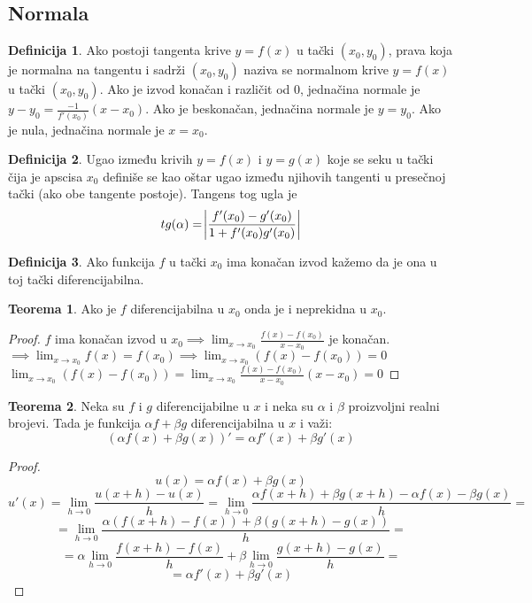 \documentclass{article}
\theoremstyle{definition}
\newtheorem{definition}{Definicija}[section]
\newtheorem{theorem}{Teorema}[section]
\begin{document}
        \subsection{Normala}
            \begin{definition}
                Ako postoji tangenta krive $y = f(x)$ u tački $(x_0, y_0)$, prava koja je normalna na tangentu i sadrži $(x_0, y_0)$ naziva se normalnom krive $y = f(x)$ u tački $(x_0, y_0)$.
                Ako je izvod konačan i različit od 0, jednačina normale je $y - y_0 = \frac{-1}{f'(x_0)}(x - x_0)$. Ako je beskonačan, jednačina normale je $y = y_0$. Ako je nula, jednačina normale je $x = x_0$.
            \end{definition}

        \begin{definition}
            Ugao između krivih $y = f(x)$ i $y = g(x)$ koje se seku u tački čija je apscisa $x_0$ definiše se kao oštar ugao između njihovih tangenti u presečnoj tački (ako obe tangente postoje). Tangens tog ugla je
            $$tg(\alpha) = \abs{\frac{f'(x_0) - g'(x_0)}{1 + f'(x_0)g'(x_0)}}$$
        \end{definition}

        \begin{definition}
            Ako funkcija $f$ u tački $x_0$ ima konačan izvod kažemo da je ona u toj tački diferencijabilna.
        \end{definition}

        \begin{theorem}
            Ako je $f$ diferencijabilna u $x_0$ onda je i neprekidna u $x_0$.
        \end{theorem}
        \begin{proof}
            $f$ ima konačan izvod u $x_0 \implies \lim_{x \to x_0} \frac{f(x) - f(x_0)}{x - x_0}$ je konačan.
            $\implies \lim_{x \to x_0} f(x) = f(x_0) \implies \lim_{x \to x_0} (f(x) - f(x_0)) = 0$
            $\lim_{x \to x_0} (f(x) - f(x_0)) = \lim_{x \to x_0} \frac{f(x) - f(x_0)}{x - x_0}(x - x_0) = 0$
        \end{proof}

        \begin{theorem}
            Neka su $f$ i $g$ diferencijabilne u $x$ i neka su $\alpha$ i $\beta$ proizvoljni realni brojevi. Tada je funkcija $\alpha f + \beta g$ diferencijabilna u $x$ i važi:
            $$(\alpha f(x) + \beta g(x))' = \alpha f'(x) + \beta g'(x)$$
        \end{theorem}
        \begin{proof}
            $$u(x) = \alpha f(x) + \beta g(x)$$
            $$u'(x) = \lim_{h \to 0} \frac{u(x + h) - u(x)}{h} = \lim_{h \to 0} \frac{\alpha f(x + h) + \beta g(x + h) - \alpha f(x) - \beta g(x)}{h} =$$
            $$= \lim_{h \to 0} \frac{\alpha(f(x + h) - f(x)) + \beta(g(x + h) - g(x))}{h} =$$
            $$= \alpha\lim_{h \to 0} \frac{f(x + h) - f(x)}{h} + \beta \lim_{h \to 0} \frac{g(x + h) - g(x)}{h} =$$
            $$= \alpha f'(x) + \beta g'(x)$$
        \end{proof}
\end{document}
